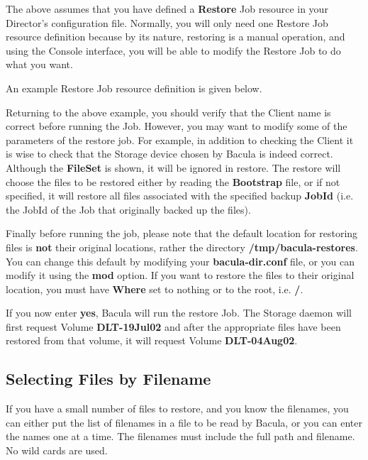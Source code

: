 The above assumes that you have defined a {\bf Restore} Job resource in your
Director's configuration file. Normally, you will only need one Restore Job
resource definition because by its nature, restoring is a manual operation,
and using the Console interface, you will be able to modify the Restore Job to
do what you want. 

An example Restore Job resource definition is given below. 

Returning to the above example, you should verify that the Client name is
correct before running the Job. However, you may want to modify some of the
parameters of the restore job. For example, in addition to checking the Client
it is wise to check that the Storage device chosen by Bacula is indeed
correct. Although the {\bf FileSet} is shown, it will be ignored in restore.
The restore will choose the files to be restored either by reading the {\bf
Bootstrap} file, or if not specified, it will restore all files associated
with the specified backup {\bf JobId} (i.e. the JobId of the Job that
originally backed up the files). 

Finally before running the job, please note that the default location for
restoring files is {\bf not} their original locations, rather the directory
{\bf /tmp/bacula-restores}. You can change this default by modifying your {\bf
bacula-dir.conf} file, or you can modify it using the {\bf mod} option. If you
want to restore the files to their original location, you must have {\bf
Where} set to nothing or to the root, i.e. {\bf /}. 

If you now enter {\bf yes}, Bacula will run the restore Job. The Storage
daemon will first request Volume {\bf DLT-19Jul02} and after the appropriate
files have been restored from that volume, it will request Volume {\bf
DLT-04Aug02}. 

\subsection*{Selecting Files by Filename}

If you have a small number of files to restore, and you know the filenames,
you can either put the list of filenames in a file to be read by Bacula, or
you can enter the names one at a time. The filenames must include the full
path and filename. No wild cards are used. 


